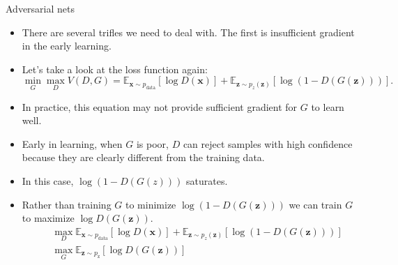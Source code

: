 \documentclass[10pt]{beamer}
\begin{document}
	\begin{frame}{Adversarial nets}
	
		\begin{itemize}
			\item There are several trifles we need to deal with. The first is insufficient gradient in the early learning.
			
			\item Let's take a look at the loss function again:
			$$
			\mathop{\min}_{G}\mathop{\max}_{D}V(D,G)=\mathbb{E}_{\bm{x}\sim p_{\text{data}}}\left[\log D(\bm{x})\right]+\mathbb{E}_{\bm{z}\sim p_z(\bm{z})}\left[\log(1-D(G(\bm{z})))\right].
			$$
			\item In practice, this equation may not provide sufficient gradient for $G$ to learn well.
			\item Early in learning, when $G$ is poor, $D$ can reject samples with high confidence because they are clearly different from the training data.
			\item In this case, $\log(1-D(G(z)))$ saturates.
			\item Rather than training $G$ to minimize $\log(1-D(G(\bm{z})))$ we can train $G$ to maximize $\log D(G(\bm{z}))$.
			\begin{eqnarray*}
			&&\mathop{\max}_{D}\mathbb{E}_{\bm{x}\sim p_{\text{data}}}\left[\log D(\bm{x})\right]+\mathbb{E}_{\bm{z}\sim p_z(\bm{z})}\left[\log(1-D(G(\bm{z})))\right] \\
			&&\mathop{\max}_{G}\mathbb{E}_{\bm{z}\sim p_{\text{z}}}\left[\log D(G(\bm{z}))\right]
			\end{eqnarray*}
		\end{itemize}
	\end{frame}
\end{document}
